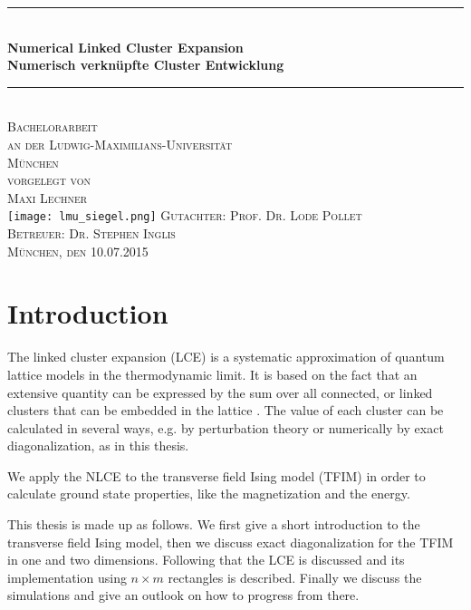 \documentclass[a4paper,12pt]{article}
\begin{document}
\begin{titlepage}
\begin{center}

\newcommand{\HRule}{\rule{\linewidth}{0.5mm}} \HRule \\[0.4cm] { \huge
  \bfseries Numerical Linked Cluster Expansion\\[0.4cm]
\Large \bfseries Numerisch verkn\"upfte Cluster Entwicklung}\\[0.4cm]

\HRule \\[1.5cm]

\textsc{\large Bachelorarbeit}\\[0.1cm]
\textsc{\large an der Ludwig-Maximilians-Universit\"at\\ M\"unchen}\\[0.3cm]
\textsc{\large vorgelegt von\\[0.1cm]
Maxi Lechner}\\[0.4cm]
\texttt{[image: lmu\_siegel.png]}
\vfill
\textsc{\large Gutachter: Prof. Dr. Lode Pollet}\\[0.3cm]
\textsc{\large Betreuer: Dr. Stephen Inglis}\\[0.3cm]
\textsc{\large M\"unchen, den 10.07.2015}\\
\end{center}
\end{titlepage}

\newpage

\tableofcontents
\newpage

\section{Introduction}
The linked cluster expansion (LCE) is a systematic approximation of quantum
lattice models in the thermodynamic limit. It is based on the fact
that an extensive quantity can be expressed by the sum over all
connected, or linked clusters that can be embedded in the lattice
\cite{Series,Rigol}. The value of each cluster can be calculated in
several ways, e.g. by perturbation theory \cite{Series} or numerically
by exact diagonalization, as in this thesis.

We apply the NLCE to the transverse field Ising model (TFIM) in order to
calculate ground state properties, like the magnetization and the energy.

This thesis is made up as follows. We first give a short introduction
to the transverse field Ising model, then we discuss exact
diagonalization for the TFIM in one and two dimensions. Following that the
LCE is discussed and its implementation using $n \times m$ rectangles
is described. Finally we discuss the simulations and give an outlook
on how to progress from there.
\end{document}
